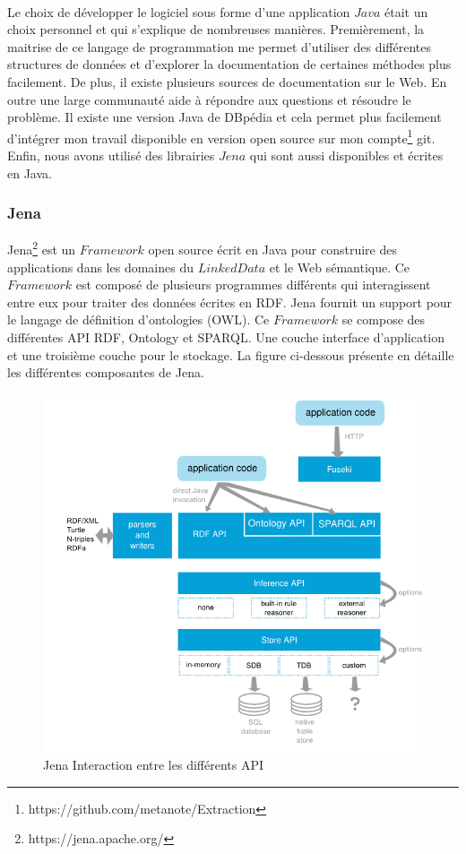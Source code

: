 \documentclass[12pt,a4	]{report}
\begin{document}
\paragraph{}
Le choix de développer le logiciel sous forme d'une application $Java$ était un choix personnel et qui s'explique de nombreuses manières. Premièrement, la maitrise de ce langage de programmation me permet d'utiliser des différentes structures de données et d'explorer la documentation de certaines méthodes plus facilement. De plus, il existe plusieurs sources de documentation sur le Web. En outre une large communauté aide à répondre aux questions et résoudre le problème. Il existe une version Java de DBpédia et cela permet plus facilement d'intégrer mon travail disponible en version open source sur mon compte\footnote{https://github.com/metanote/Extraction} git. Enfin, nous avons utilisé des librairies $Jena$ qui sont aussi disponibles et écrites en Java. 
\subsubsection*{Jena}
Jena\footnote{https://jena.apache.org/} est un $Framework$ open source écrit en Java pour construire des applications dans les domaines du
$LinkedData$ et le Web sémantique. Ce $Framework$ est composé de plusieurs programmes différents qui interagissent entre eux pour traiter des données écrites en RDF. Jena fournit un support pour le langage de définition d'ontologies (OWL). Ce $Framework$ se compose des différentes API RDF, Ontology et SPARQL. Une couche interface d'application et une troisième couche pour le stockage. La figure ci-dessous présente en détaille les différentes composantes de Jena.
 \begin{figure}[H]
        \centering
                \includegraphics[width=13cm]{Jena.png}
               \caption{Jena Interaction entre les différents API}
\end{figure}
\end{document}
